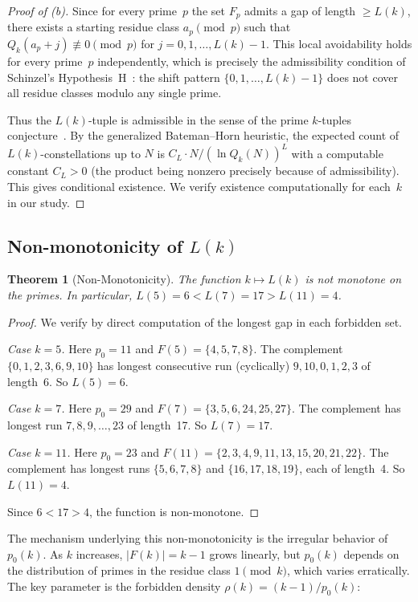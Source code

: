 \documentclass[11pt,a4paper]{article}
\newtheorem{theorem}{Theorem}[section]
\newcommand{\Qk}{Q_k}
\begin{document}
\begin{proof}[Proof of \textup{(b)}]
Since for every prime~$p$ the set $F_p$ admits a gap of length $\ge L(k)$, there exists a starting residue class $a_p \pmod{p}$ such that $\Qk(a_p+j) \not\equiv 0 \pmod{p}$ for $j = 0, 1, \ldots, L(k)-1$. This local avoidability holds for every prime~$p$ independently, which is precisely the admissibility condition of Schinzel's Hypothesis~H~\cite{schinzel}: the shift pattern $\{0, 1, \ldots, L(k)-1\}$ does not cover all residue classes modulo any single prime.

Thus the $L(k)$-tuple is admissible in the sense of the prime $k$-tuples conjecture~\cite{hardylittlewood}. By the generalized Bateman--Horn heuristic, the expected count of $L(k)$-constellations up to $N$ is $C_L \cdot N / (\ln \Qk(N))^L$ with a computable constant $C_L > 0$ (the product being nonzero precisely because of admissibility). This gives conditional existence. We verify existence computationally for each~$k$ in our study.
\end{proof}

\subsection{Non-monotonicity of $L(k)$}

\begin{theorem}[Non-Monotonicity]\label{thm:nonmono}
The function $k \mapsto L(k)$ is not monotone on the primes. In particular, $L(5) = 6 < L(7) = 17 > L(11) = 4$.
\end{theorem}

\begin{proof}
We verify by direct computation of the longest gap in each forbidden set.

\emph{Case $k = 5$.}
Here $p_0 = 11$ and $F(5) = \{4, 5, 7, 8\}$. The complement $\{0, 1, 2, 3, 6, 9, 10\}$ has longest consecutive run (cyclically) $9, 10, 0, 1, 2, 3$ of length~6. So $L(5) = 6$.

\emph{Case $k = 7$.}
Here $p_0 = 29$ and $F(7) = \{3, 5, 6, 24, 25, 27\}$. The complement has longest run $7, 8, 9, \ldots, 23$ of length~17. So $L(7) = 17$.

\emph{Case $k = 11$.}
Here $p_0 = 23$ and $F(11) = \{2, 3, 4, 9, 11, 13, 15, 20, 21, 22\}$. The complement has longest runs $\{5, 6, 7, 8\}$ and $\{16, 17, 18, 19\}$, each of length~4. So $L(11) = 4$.

Since $6 < 17 > 4$, the function is non-monotone.
\end{proof}

The mechanism underlying this non-monotonicity is the irregular behavior of $p_0(k)$. As $k$ increases, $|F(k)| = k-1$ grows linearly, but $p_0(k)$ depends on the distribution of primes in the residue class $1 \pmod{k}$, which varies erratically. The key parameter is the forbidden density $\rho(k) = (k-1)/p_0(k)$:
\end{document}
